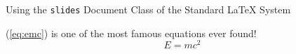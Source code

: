 \documentclass[landscape,12pt]{slides}
\begin{document}
\begin{slide}
  \begin{center}
    \Huge
    Using the \texttt{slides} Document Class of the Standard {\LaTeX} System
  \end{center}
\end{slide}
  
\begin{slide}
  (\ref{eq:emc}) is one of the most famous equations ever found!
  \begin{equation}
    E=mc^2
    \label{eq:emc}
  \end{equation}
\end{slide}
\end{document}
